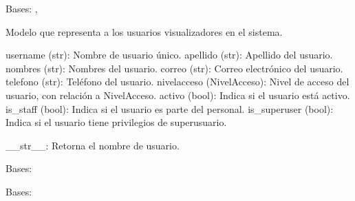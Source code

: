 \documentclass[letterpaper,10pt,spanish]{sphinxmanual}
\begin{document}
\begin{fulllineitems}

\pysigstartsignatures
{}
\pysigstopsignatures
\sphinxAtStartPar
Bases: , 

\sphinxAtStartPar
Modelo que representa a los usuarios visualizadores en el sistema.
\begin{description}
\sphinxAtStartPar
username (str): Nombre de usuario único.
apellido (str): Apellido del usuario.
nombres (str): Nombres del usuario.
correo (str): Correo electrónico del usuario.
telefono (str): Teléfono del usuario.
nivelacceso (NivelAcceso): Nivel de acceso del usuario, con relación a NivelAcceso.
activo (bool): Indica si el usuario está activo.
is\_staff (bool): Indica si el usuario es parte del personal.
is\_superuser (bool): Indica si el usuario tiene privilegios de superusuario.

\sphinxAtStartPar
\_\_str\_\_: Retorna el nombre de usuario.

\end{description}


\begin{fulllineitems}

\pysigstartsignatures
{}
\pysigstopsignatures
\sphinxAtStartPar
Bases: 

\end{fulllineitems}



\begin{fulllineitems}

\pysigstartsignatures
{}
\pysigstopsignatures
\sphinxAtStartPar
Bases: 

\end{fulllineitems}



\begin{fulllineitems}


\end{fulllineitems}
\end{fulllineitems}
\end{document}
